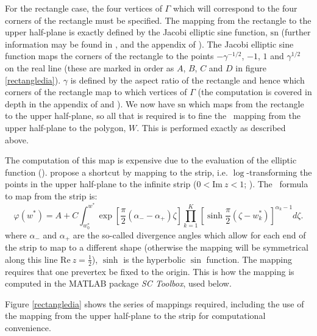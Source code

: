 For the rectangle case, the four vertices of $\Gamma$ which will correspond to the four corners of the rectangle must be specified. The mapping from the rectangle to the upper half-plane is exactly defined by the Jacobi elliptic sine function, $\text{sn}$ (further information may be found in ,  and the appendix of ). The Jacobi elliptic sine function maps the corners of the rectangle to the points $-\gamma^{-1/2}$, $-1$, $1$ and $\gamma^{1/2}$ on the real line (these are marked in order as $A$, $B$, $C$ and $D$ in figure \ref{rectangledia}). $\gamma$ is defined by the aspect ratio of the rectangle and hence which corners of the rectangle map to which vertices of $\Gamma$ (the computation is covered in depth in the appendix of  and ). We now have $\text{sn}$ which maps from the rectangle to the upper half-plane, so all that is required is to fine the \sch\ mapping from the upper half-plane to the polygon, $W$. This is performed exactly as described above.

\label{cor-3s16}The computation of this map is expensive due to the evaluation of the elliptic function (\cite[p. 49]{driscoll}).  propose a shortcut by mapping to the strip, i.e. $\log$-transforming the points in the upper half-plane to the infinite strip ($0 < \text{Im}\ z < 1$; ). The \sch\ formula to map from the strip is:
\begin{equation*}
\varphi(w^*) = A + C \int^{w^*}_{w^*_0} \exp\left[ \frac{\pi}{2}\left(\alpha_- - \alpha_+\right)\zeta\right] \prod_{k=1}^{K} \left [ \sinh\frac{\pi}{2}(\zeta - w^*_k) \right]^{\alpha_k-1} d\zeta.
\end{equation*}
where $\alpha_-$ and $\alpha_+$ are the so-called divergence angles which allow for each end of the strip to map to a different shape (otherwise the mapping will be symmetrical along this line $\text{Re}\ z = \frac{1}{2}$), $\sinh$ is the hyperbolic $\sin$ function. The mapping requires that one prevertex be fixed to the origin. This is how the mapping is computed in the MATLAB package \textit{SC Toolbox}, used below\label{cor-soft4}. 

Figure \ref{rectangledia} shows the series of mappings required, including the use of the mapping from the upper half-plane to the strip for computational convenience.

